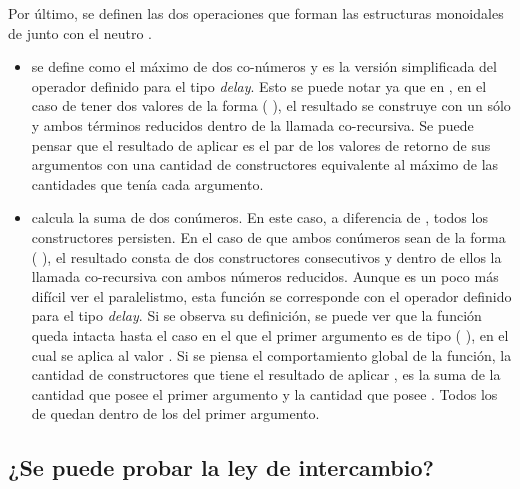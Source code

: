 Por último, se definen las dos operaciones que forman las estructuras monoidales de  junto con el neutro . \begin{itemize}[noitemsep]
\item {} se define como el máximo de dos co-números y es la versión simplificada del operador  definido para el tipo \textit{delay}. Esto se puede notar ya que en , en el caso de tener dos valores de la forma ( ), el resultado se construye con un sólo  y ambos términos reducidos dentro de la llamada co-recursiva. Se puede pensar que el resultado de aplicar  es el par de los valores de retorno de sus argumentos con una cantidad de constructores  equivalente al máximo de las cantidades que tenía cada argumento. 

\item {} calcula la suma de dos conúmeros. En este caso, a diferencia de , todos los constructores  persisten. En el caso de que ambos conúmeros sean de la forma ( ), el resultado consta de dos constructores  consecutivos y dentro de ellos la llamada co-recursiva con ambos números reducidos. Aunque es un poco más difícil ver el paralelistmo, esta función se corresponde con el operador  definido para el tipo \textit{delay}. Si se observa su definición, se puede ver que la función  queda intacta hasta el caso en el que el primer argumento es de tipo ( ), en el cual se aplica al valor . Si se piensa el comportamiento global de la función, la cantidad de constructores  que tiene el resultado de aplicar , es la suma de la cantidad que posee el primer argumento y la cantidad que posee . Todos los  de  quedan dentro de los del primer argumento.  
\end{itemize}


\subsection{¿Se puede probar la ley de intercambio?}\label{casodelay:conat:ichange}

